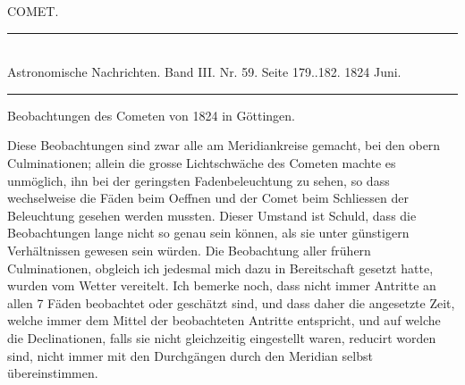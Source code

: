 \clearpage
{}
\hypertarget{native-455-comet}{}
\begin{center}
{\large COMET.}
\end{center}

\begin{center}
\rule{6cm}{0.4pt}\\
Astronomische Nachrichten. Band III. Nr. 59. Seite 179..182. 1824 Juni.\\
\rule{6cm}{0.4pt}
\end{center}

\begin{center}
Beobachtungen des Cometen von 1824 in Göttingen.
\end{center}

Diese Beobachtungen sind zwar alle am Meridiankreise gemacht, bei den obern
Culminationen; allein die grosse Lichtschwäche des Cometen machte es
unmöglich, ihn bei der geringsten Fadenbeleuchtung zu sehen, so dass
wechselweise die Fäden beim Oeffnen und der Comet beim Schliessen der
Beleuchtung gesehen werden mussten. Dieser Umstand ist Schuld, dass die
Beobachtungen lange nicht so genau sein können, als sie unter günstigern
Verhältnissen gewesen sein würden. Die Beobachtung aller frühern
Culminationen, obgleich ich jedesmal mich dazu in Bereitschaft gesetzt hatte,
wurden vom Wetter vereitelt. Ich bemerke noch, dass nicht immer Antritte an
allen 7 Fäden beobachtet oder geschätzt sind, und dass daher die angesetzte
Zeit, welche immer dem Mittel der beobachteten Antritte entspricht, und auf
welche die Declinationen, falls sie nicht gleichzeitig eingestellt waren,
reducirt worden sind, nicht immer mit den Durchgängen durch den Meridian
selbst übereinstimmen.

